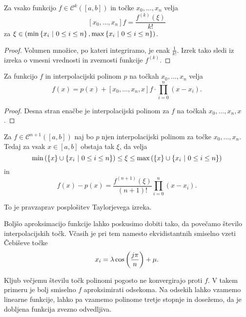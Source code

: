 \begin{posledica}
Za vsako funkcijo $f \in \mathcal{C}^k([a,b])$ in točke
$x_0, \dots, x_n$ velja
\[
[x_0, \dots, x_n] f = \frac{f^{(k)}(\xi)}{k!}
\]
za $\xi \in \left(\min \left\{x_i~\middle\vert~0 \leq i \leq n\right\},
\max \left\{x_i~\middle\vert~0 \leq i \leq n\right\}\right)$.
\end{posledica}

\begin{proof}
Volumen množice, po kateri integriramo, je enak $\frac{1}{k!}$.
Izrek tako sledi iz izreka o vmesni vrednosti in zveznosti funkcije
$f^{(k)}$.
\end{proof}

\begin{izrek}
Za funkcijo $f$ in interpolacijski polinom $p$ na točkah
$x_0, \dots, x_n$ velja
\[
f(x) = p(x) + [x_0, \dots, x_n, x] f \cdot \prod_{i=0}^n (x - x_i).
\]
\end{izrek}

\begin{proof}
Desna stran enačbe je interpolacijski polinom za $f$ na točkah
$x_0, \dots, x_n, x$.
\end{proof}

\begin{posledica}
Za $f \in \mathcal{C}^{n+1}([a,b])$ naj bo $p$ njen interpolacijski
polinom za točke $x_0, \dots, x_n$. Tedaj za vsak $x \in [a,b]$
obstaja tak $\xi$, da velja
\[
\min \left(\left\{x\right\} \cup \left\{x_i~\middle\vert~0 \leq i \leq n\right\}\right) \leq
\xi \leq
\max \left(\left\{x\right\} \cup \left\{x_i~\middle\vert~0 \leq i \leq n\right\}\right)
\]
in
\[
f(x) - p(x) =
\frac{f^{(n+1)}(\xi)}{(n+1)!} \prod_{i=0}^n (x - x_i).
\]
\end{posledica}

\obvs

\begin{opomba}
To je pravzaprav posplošitev Taylorjevega izreka.
\end{opomba}

\begin{opomba}
Boljšo aproksimacijo funkcije lahko poskusimo dobiti tako, da
povečamo število interpolacijskih točk. Včasih je pri tem namesto
ekvidistantnih smiselno vzeti Čebiševe točke
\[
x_i = \lambda \cos \left(\frac{j \pi}{n}\right) + \mu.
\]
\end{opomba}

\begin{opomba}
Kljub večjemu številu točk polinomi pogosto ne konvergirajo proti
$f$. V takem primeru je bolj smiselno $f$ aproksimirati odsekoma.
Na odsekih lahko vzamemo linearne funkcije, lahko pa vzamemo
polinome tretje stopnje in dosežemo, da je dobljena funkcija zvezno
odvedljiva.
\end{opomba}
